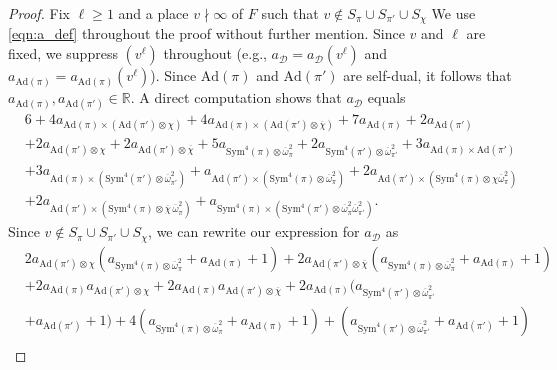 \documentclass[10pt,a4paper]{amsart}
\begin{document}
\begin{proof}
Fix $\ell\geq 1$ and a place $v\nmid\infty$ of $F$ such that $v\notin S_{\pi}\cup S_{\pi'}\cup S_{\chi}$ We use \eqref{eqn:a_def} throughout the proof without further mention.  Since $v$ and $\ell$ are fixed, we suppress $(v^{\ell})$ throughout (e.g., $a_{\mathcal{D}}=a_{\mathcal{D}}(v^{\ell})$ and $a_{\mathrm{Ad}(\pi)}=a_{\mathrm{Ad}(\pi)}(v^{\ell})$).  Since $\mathrm{Ad}(\pi)$ and $\mathrm{Ad}(\pi')$ are self-dual, it follows that $a_{\mathrm{Ad}(\pi)},a_{\mathrm{Ad}(\pi')}\in\mathbb{R}$.  A direct computation shows that $a_{\mathcal{D}}$ equals
\begin{align*}
&6+4a_{\mathrm{Ad}(\pi)\times(\mathrm{Ad}(\pi')\otimes\chi)}+4a_{\mathrm{Ad}(\pi)\times(\mathrm{Ad}(\pi')\otimes\overline{\chi})}+7a_{\mathrm{Ad}(\pi)}+2a_{\mathrm{Ad}(\pi')}\\
&+2a_{\mathrm{Ad}(\pi')\otimes\chi}+2a_{\mathrm{Ad}(\pi')\otimes\overline{\chi}}+5a_{\mathrm{Sym}^4(\pi)\otimes\overline{\omega}_{\pi}^{2}} + 2a_{\mathrm{Sym}^4(\pi')\otimes\overline{\omega}_{\pi'}^{2}} + 3a_{\mathrm{Ad}(\pi)\times\mathrm{Ad}(\pi')} \\
&+ 3a_{\mathrm{Ad}(\pi)\times(\mathrm{Sym}^4(\pi')\otimes\overline{\omega}_{\pi'}^{2})}+ a_{\mathrm{Ad}(\pi')\times(\mathrm{Sym}^4(\pi)\otimes\overline{\omega}_{\pi}^{2})}+ 2a_{\mathrm{Ad}(\pi')\times(\mathrm{Sym}^4(\pi)\otimes\chi \overline{\omega}_{\pi}^{2})}\\
&+2a_{\mathrm{Ad}(\pi')\times(\mathrm{Sym}^4(\pi)\otimes\overline{\chi}\,\overline{\omega}_{\pi}^{2})} + a_{\mathrm{Sym}^4(\pi)\times(\mathrm{Sym}^4(\pi')\otimes\overline{\omega}_{\pi}^{2} \overline{\omega}_{\pi'}^{2})}.
\end{align*}
Since $v\notin S_{\pi}\cup S_{\pi'}\cup S_{\chi}$, we can rewrite our expression for $a_{\mathcal{D}}$ as
\begin{align*}
&2 a_{\mathrm{Ad}(\pi')\otimes\chi} (a_{\mathrm{Sym}^4(\pi)\otimes\overline{\omega}_{\pi}^2}+a_{\mathrm{Ad}(\pi)}+1)+2 a_{\mathrm{Ad}(\pi')\otimes\overline{\chi}} (a_{\mathrm{Sym}^4(\pi)\otimes\overline{\omega}_{\pi}^2}+a_{\mathrm{Ad}(\pi)}+1)\\
&+2 a_{\mathrm{Ad}(\pi)} a_{\mathrm{Ad}(\pi')\otimes\chi}+2 a_{\mathrm{Ad}(\pi)} a_{\mathrm{Ad}(\pi')\otimes\overline{\chi}}+2 a_{\mathrm{Ad}(\pi)} (a_{\mathrm{Sym}^4(\pi')\otimes\overline{\omega}_{\pi'}^2}\\
&+a_{\mathrm{Ad}(\pi')}+1)+4 (a_{\mathrm{Sym}^4(\pi)\otimes\overline{\omega}_{\pi}^2}+a_{\mathrm{Ad}(\pi)}+1)+(a_{\mathrm{Sym}^4(\pi')\otimes\overline{\omega}_{\pi'}^2}+a_{\mathrm{Ad}(\pi')}+1)\\

\end{align*}
\end{proof}
\end{document}
